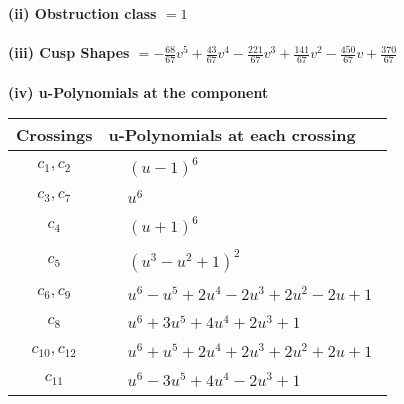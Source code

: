 \documentclass[1p]{elsarticle_modified}
\theoremstyle{definition}
\begin{document}
\flushleft \textbf{(ii) Obstruction class $= 1$}\\~\\
\flushleft \textbf{(iii) Cusp Shapes $= -\frac{68}{67} v^5+\frac{43}{67} v^4-\frac{221}{67} v^3+\frac{141}{67} v^2-\frac{450}{67} v+\frac{370}{67}$}\\~\\
\newpage\renewcommand{\arraystretch}{1}
\flushleft \textbf{(iv) u-Polynomials at the component}\newline \\
\begin{tabular}{m{50pt}|m{274pt}}
Crossings & \hspace{64pt}u-Polynomials at each crossing \\
\hline $$\begin{aligned}c_{1},c_{2}\end{aligned}$$&$\begin{aligned}
&(u-1)^6
\end{aligned}$\\
\hline $$\begin{aligned}c_{3},c_{7}\end{aligned}$$&$\begin{aligned}
&u^6
\end{aligned}$\\
\hline $$\begin{aligned}c_{4}\end{aligned}$$&$\begin{aligned}
&(u+1)^6
\end{aligned}$\\
\hline $$\begin{aligned}c_{5}\end{aligned}$$&$\begin{aligned}
&(u^3- u^2+1)^2
\end{aligned}$\\
\hline $$\begin{aligned}c_{6},c_{9}\end{aligned}$$&$\begin{aligned}
&u^6- u^5+2 u^4-2 u^3+2 u^2-2 u+1
\end{aligned}$\\
\hline $$\begin{aligned}c_{8}\end{aligned}$$&$\begin{aligned}
&u^6+3 u^5+4 u^4+2 u^3+1
\end{aligned}$\\
\hline $$\begin{aligned}c_{10},c_{12}\end{aligned}$$&$\begin{aligned}
&u^6+u^5+2 u^4+2 u^3+2 u^2+2 u+1
\end{aligned}$\\
\hline $$\begin{aligned}c_{11}\end{aligned}$$&$\begin{aligned}
&u^6-3 u^5+4 u^4-2 u^3+1
\end{aligned}$\\
\hline
\end{tabular}\\~\\
\end{document}
